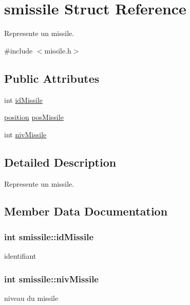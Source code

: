 \hypertarget{structsmissile}{}\section{smissile Struct Reference}
\label{structsmissile}


Represente un missile.  




{\ttfamily \#include $<$missile.\+h$>$}

\subsection*{Public Attributes}
\begin{DoxyCompactItemize}
\item 
int \hyperlink{structsmissile_acea0a3cbd96d9085d2e6292d594bd26a}{id\+Missile}
\item 
\hyperlink{structsposition}{position} \hyperlink{structsmissile_a005c70a80285c73e9fac6cf42032e4c7}{pos\+Missile}
\item 
int \hyperlink{structsmissile_a971b40f76d8bb3fee6d6759b2551c92e}{niv\+Missile}
\end{DoxyCompactItemize}


\subsection{Detailed Description}
Represente un missile. 

\subsection{Member Data Documentation}
\subsubsection[{\texorpdfstring{id\+Missile}{idMissile}}]{\setlength{\rightskip}{0pt plus 5cm}int smissile\+::id\+Missile}\hypertarget{structsmissile_acea0a3cbd96d9085d2e6292d594bd26a}{}\label{structsmissile_acea0a3cbd96d9085d2e6292d594bd26a}
identifiant 
\subsubsection[{\texorpdfstring{niv\+Missile}{nivMissile}}]{\setlength{\rightskip}{0pt plus 5cm}int smissile\+::niv\+Missile}\hypertarget{structsmissile_a971b40f76d8bb3fee6d6759b2551c92e}{}\label{structsmissile_a971b40f76d8bb3fee6d6759b2551c92e}
niveau du missile 

